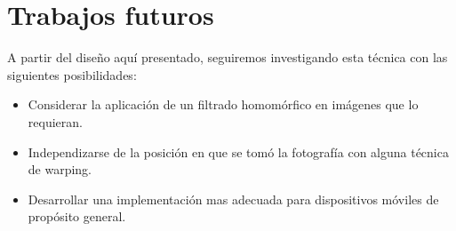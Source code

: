 \documentclass[conference,spanish,a4paper,10pt,oneside,final]{tfmpd}
\begin{document}
\section{Trabajos futuros}
A partir del diseño aquí presentado, seguiremos investigando esta técnica con las siguientes
posibilidades:
\begin{itemize}
\item Considerar la aplicación de un filtrado homomórfico en imágenes que lo requieran.
\item Independizarse de la posición en que se tomó la fotografía con alguna técnica de warping.
\item Desarrollar una implementación mas adecuada para dispositivos móviles de
propósito general.\end{itemize}

\nocite{*}


\end{document}
